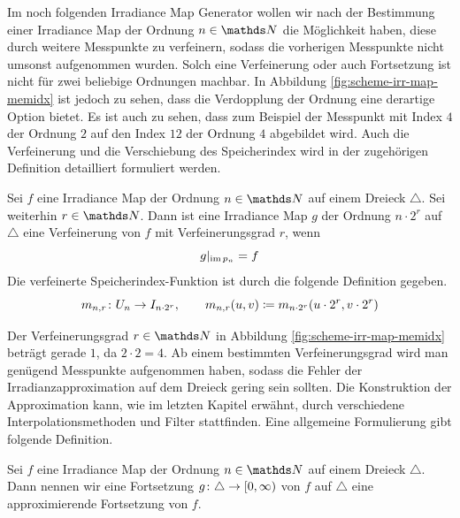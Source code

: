 		Im noch folgenden Irradiance Map Generator wollen wir nach der Bestimmung einer Irradiance Map der Ordnung $n\in\SN$ die Möglichkeit haben, diese durch weitere Messpunkte zu verfeinern, sodass die vorherigen Messpunkte nicht umsonst aufgenommen wurden.
		Solch eine Verfeinerung oder auch Fortsetzung ist nicht für zwei beliebige Ordnungen machbar.
		In Abbildung \ref{fig:scheme-irr-map-memidx} ist jedoch zu sehen, dass die Verdopplung der Ordnung eine derartige Option bietet.
		Es ist auch zu sehen, dass zum Beispiel der Messpunkt mit Index $4$ der Ordnung $2$ auf den Index $12$ der Ordnung $4$ abgebildet wird.
		Auch die Verfeinerung und die Verschiebung des Speicherindex wird in der zugehörigen Definition detailliert formuliert werden.
		\begin{definition}
			Sei $f$ eine Irradiance Map der Ordnung $n\in\SN$ auf einem Dreieck $\triangle$.
			Sei weiterhin $r\in\SN$.
			Dann ist eine Irradiance Map $g$ der Ordnung $n\cdot 2^r$ auf $\triangle$ eine Verfeinerung von $f$ mit Verfeinerungsgrad $r$, wenn
			\[
				g\vert_{\operatorname{im} p_n} = f
			\]
			Die verfeinerte Speicherindex-Funktion ist durch die folgende Definition gegeben.
			\[
				m_{n,r}\colon U_n\to I_{n\cdot 2^r},\qquad m_{n,r}(u,v)\coloneqq m_{n\cdot 2^r}(u\cdot 2^r,v\cdot 2^r)
			\]
		\end{definition}

		Der Verfeinerungsgrad $r\in\SN$ in Abbildung \ref{fig:scheme-irr-map-memidx} beträgt gerade $1$, da $2\cdot 2 = 4$.
		Ab einem bestimmten Verfeinerungsgrad wird man genügend Messpunkte aufgenommen haben, sodass die Fehler der Irradianzapproximation auf dem Dreieck gering sein sollten.
		Die Konstruktion der Approximation kann, wie im letzten Kapitel erwähnt, durch verschiedene Interpolationsmethoden und Filter stattfinden.
		Eine allgemeine Formulierung gibt folgende Definition.
		\begin{definition}
			Sei $f$ eine Irradiance Map der Ordnung $n\in\SN$ auf einem Dreieck $\triangle$.
			Dann nennen wir eine Fortsetzung $g\colon\triangle\to[0,\infty)$ von $f$ auf $\triangle$ eine approximierende Fortsetzung von $f$.
		\end{definition}

